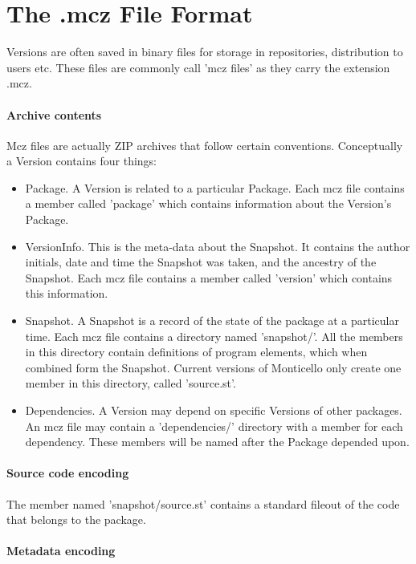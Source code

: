 \documentclass[a4paper,10pt,twoside]{book}
\begin{document}
\section{The .mcz File Format}

Versions are often saved in binary files for storage in repositories, distribution to users etc. These files are commonly call 'mcz files' as they carry the extension .mcz.

\paragraph{Archive contents}

Mcz files are actually ZIP archives that follow certain conventions. Conceptually a Version contains four things:

\begin{itemize}
\item Package. A Version is related to a particular Package. Each mcz file contains a member called 'package' which contains information about the Version's Package.

\item VersionInfo. This is the meta-data about the Snapshot. It contains the author initials, date and time the Snapshot was taken, and the ancestry of the Snapshot. Each mcz file contains a member called 'version' which contains this information.
\item Snapshot. A Snapshot is a record of the state of the package at a particular time. Each mcz file contains a directory named 'snapshot/'. All the members in this directory contain definitions of program elements, which when combined form the Snapshot. Current versions of Monticello only create one member in this directory, called 'source.st'.
\item Dependencies. A Version may depend on specific Versions of other packages. An mcz file may contain a 'dependencies/' directory with a member for each dependency. These members will be named after the Package depended upon.
\end{itemize}

\paragraph{Source code encoding}

The member named 'snapshot/source.st' contains a standard fileout of the code that belongs to the package.

\paragraph{Metadata encoding}
\end{document}
